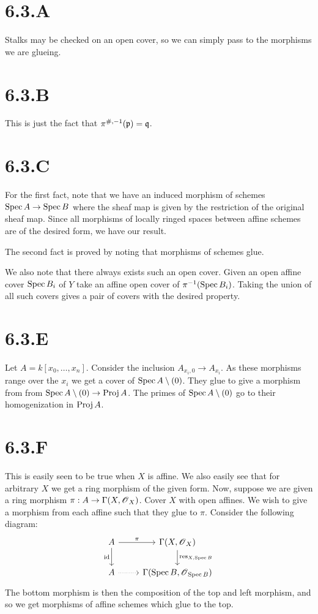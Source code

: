 \documentclass{article}
\begin{document}
\section{6.3.A}
Stalks may be checked on an open cover, so we can simply pass to the morphisms we are glueing.

\section{6.3.B}
This is just the fact that $\pi^{\#,-1}(\mathfrak{p}) = \mathfrak{q}$.

\section{6.3.C}
For the first fact, note that we have an induced morphism of schemes $\operatorname{Spec} A \to \operatorname{Spec} B$ where the sheaf map is given by the restriction of the original sheaf map. Since all morphisms of locally ringed spaces between affine schemes are of the desired form, we have our result.

The second fact is proved by noting that morphisms of schemes glue.

We also note that there always exists such an open cover. Given an open affine cover $\operatorname{Spec} B_i$ of $Y$ take an affine open cover of $\pi^{-1}(\operatorname{Spec} B_i)$. Taking the union of all such covers gives a pair of covers with the desired property.

\section{6.3.E}
Let $A=k[x_0, \dots, x_n]$. Consider the inclusion $A_{x_i,0} \to A_{x_i}$. As these morphisms range over the $x_i$ we get a cover of $\operatorname{Spec} A \setminus (0)$. They glue to give a morphism from from $\operatorname{Spec} A \setminus (0) \to \operatorname{Proj} A$. The primes of $\operatorname{Spec} A \setminus (0)$ go to their homogenization in $\operatorname{Proj} A$.

\section{6.3.F}
This is easily seen to be true when $X$ is affine. We also easily see that for arbitrary $X$ we get a ring morphism of the given form. Now, suppose we are given a ring morphism $\pi: A \to \Gamma(X, \operatorname{\mathscr{O}}_X)$. Cover $X$ with open affines. We wish to give a morphism from each affine such that they glue to $\pi$. Consider the following diagram:
\[
    \begin{tikzcd}
        A \ar[r, "\pi"] \ar[d, "\text{id}", swap] & \Gamma(X, \Osh_X) \ar[d, "\operatorname{res}_{X, \Spec B}"] \\
        A \ar[r, dotted]                          & \Gamma(\Spec B, \Osh_{\Spec B})
    \end{tikzcd}
\]
The bottom morphism is then the composition of the top and left morphism, and so we get morphisms of affine schemes which glue to the top.
\end{document}
